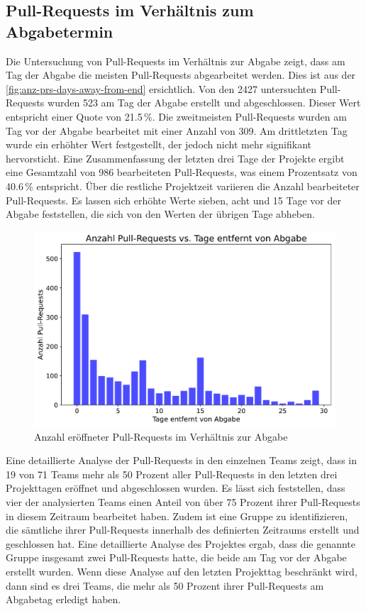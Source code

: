 \subsection{Pull-Requests im Verhältnis zum Abgabetermin}
Die Untersuchung von Pull-Requests im Verhältnis zur Abgabe zeigt, dass am Tag der Abgabe die meisten Pull-Requests abgearbeitet werden. Dies ist aus der \autoref{fig:anz-prs-days-away-from-end} ersichtlich. Von den 2427 untersuchten Pull-Requests wurden 523 am Tag der Abgabe erstellt und abgeschlossen. Dieser Wert entspricht einer Quote von 21.5\,\%.  Die zweitmeisten Pull-Requests wurden am Tag vor der Abgabe bearbeitet mit einer Anzahl von 309. Am drittletzten Tag wurde ein erhöhter Wert festgestellt, der jedoch nicht mehr signifikant hervorsticht. Eine Zusammenfassung der letzten drei Tage der Projekte ergibt eine Gesamtzahl von 986 bearbeiteten Pull-Requests, was einem Prozentsatz von 40.6\,\% entspricht. Über die restliche Projektzeit variieren die Anzahl bearbeiteter Pull-Requests. Es lassen sich erhöhte Werte sieben, acht und 15 Tage vor der Abgabe feststellen, die sich von den Werten der übrigen Tage abheben.
\begin{figure}[htbp]
    \includegraphics[width=\textwidth]{Figures/anz-prs-days-away-from-end.pdf}
    \caption{Anzahl eröffneter Pull-Requests im Verhältnis zur Abgabe}
    \label{fig:anz-prs-days-away-from-end}
\end{figure}

Eine detaillierte Analyse der Pull-Requests in den einzelnen Teams zeigt, dass in 19 von 71 Teams mehr als 50 Prozent aller Pull-Requests in den letzten drei Projekttagen eröffnet und abgeschlossen wurden. Es lässt sich feststellen, dass vier der analysierten Teams einen Anteil von über 75 Prozent ihrer Pull-Requests in diesem Zeitraum bearbeitet haben. Zudem ist eine Gruppe zu identifizieren, die sämtliche ihrer Pull-Requests innerhalb des definierten Zeitraums erstellt und geschlossen hat. Eine detaillierte Analyse des Projektes ergab, dass die genannte Gruppe insgesamt zwei Pull-Requests hatte, die beide am Tag vor der Abgabe erstellt wurden. Wenn diese Analyse auf den letzten Projekttag beschränkt wird, dann sind es drei Teams, die mehr als 50 Prozent ihrer Pull-Requests am Abgabetag erledigt haben.

